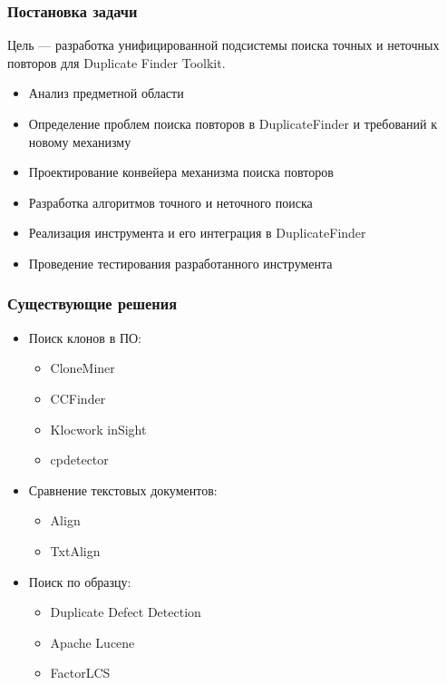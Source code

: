 \documentclass[aspectratio=169]{beamer}
\begin{document}
\begin{frame}\frametitle{Постановка задачи}
	Цель --- разработка унифицированной подсистемы поиска точных и неточных повторов для Duplicate Finder Toolkit.	
	
	\begin{itemize}
		\item Анализ предметной области
		\item Определение проблем поиска повторов в DuplicateFinder и требований к новому механизму
		\item Проектирование конвейера механизма поиска повторов
		\item Разработка алгоритмов точного и неточного поиска
		\item Реализация инструмента и его интеграция в DuplicateFinder
		\item Проведение тестирования разработанного инструмента
	\end{itemize}
\end{frame}


\begin{frame}\frametitle{Существующие решения}
	\begin{itemize}
		\item Поиск клонов в ПО:
		\begin{itemize}
			\item CloneMiner
			\item CCFinder
			\item Klocwork inSight
			\item cpdetector
		\end{itemize}
		\item Сравнение текстовых документов:
		\begin{itemize}
			\item Align
			\item TxtAlign
		\end{itemize} 
		\item Поиск по образцу: 
		\begin{itemize}
			\item Duplicate Defect Detection
			\item Apache Lucene
			\item FactorLCS
		\end{itemize}
	\end{itemize}
\end{frame}

\end{document}
